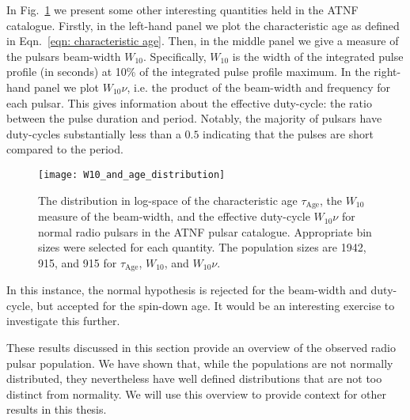 In Fig.~\ref{fig: pop stats others} we present some other interesting quantities
held in the ATNF catalogue. Firstly, in the left-hand panel we plot the characteristic
age as defined in Eqn.~\eqref{eqn: characteristic age}. Then, in the middle panel
we give a measure of the pulsars beam-width $W_{10}$. Specifically, $W_{10}$ is
the width of the integrated pulse profile (in seconds) at 10\% of the integrated
pulse profile maximum. In the right-hand panel we  plot $W_{10}\nu$, i.e. the
product of the beam-width and frequency for each pulsar. This gives information
about the effective duty-cycle: the ratio between the pulse duration and period.
Notably, the majority of pulsars have duty-cycles substantially less than a
$0.5$ indicating that the pulses are short compared to the period.
\begin{figure}[htb]
\centering
\texttt{[image: W10\_and\_age\_distribution]}
\caption{The distribution in log-space of the characteristic age
$\tau_{\textrm{Age}}$, the $W_{10}$ measure of the beam-width, and the
effective duty-cycle $W_{10} \nu$ for normal radio pulsars in the
ATNF pulsar catalogue. Appropriate bin sizes were selected for each quantity.
The population sizes are 1942, 915, and 915 for
$\tau_{\textrm{Age}}$, $W_{10}$, and $W_{10}\nu$.}
\label{fig: pop stats others}
\end{figure}
In this instance, the normal hypothesis is rejected for the beam-width and
duty-cycle, but accepted for the spin-down age. It would be an interesting
exercise to investigate this further.

These results discussed in this section provide an overview
of the observed radio pulsar population. We have shown that, while the populations
are not normally distributed, they nevertheless have well defined distributions
that are not too distinct from normality. We will use this overview to provide
context for other results in this thesis.

